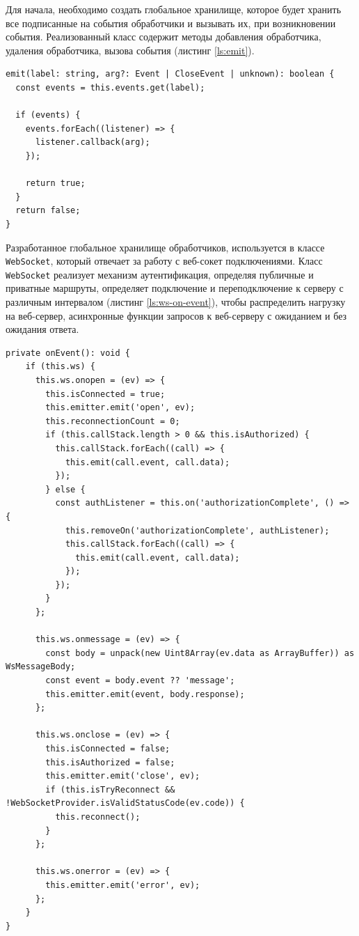 Для начала, необходимо создать глобальное хранилище, которое будет хранить все подписанные на события обработчики и вызывать их, при возникновении события. Реализованный класс содержит методы добавления обработчика, удаления обработчика, вызова события (листинг \ref{ls:emit}).

\begin{lstlisting}[caption={Метод вызова события из класса Emit}, label={ls:emit}]
emit(label: string, arg?: Event | CloseEvent | unknown): boolean {
  const events = this.events.get(label);

  if (events) {
    events.forEach((listener) => {
      listener.callback(arg);
    });

    return true;
  }
  return false;
}
\end{lstlisting}

Разработанное глобальное хранилище обработчиков, используется в классе \verb|WebSocket|, который отвечает за работу с веб-сокет подключениями. Класс \verb|WebSocket| реализует механизм аутентификация, определяя публичные и приватные маршруты, определяет подключение и переподключение к серверу с различным интервалом (листинг \ref{ls:ws-on-event}), чтобы распределить нагрузку на веб-сервер, асинхронные функции запросов к веб-серверу с ожиданием и без ожидания ответа.

\begin{lstlisting}[caption={Метод из класса WebSocket, передающий события в глобальную шину}, label={ls:ws-on-event}]
private onEvent(): void {
    if (this.ws) {
      this.ws.onopen = (ev) => {
        this.isConnected = true;
        this.emitter.emit('open', ev);
        this.reconnectionCount = 0;
        if (this.callStack.length > 0 && this.isAuthorized) {
          this.callStack.forEach((call) => {
            this.emit(call.event, call.data);
          });
        } else {
          const authListener = this.on('authorizationComplete', () => {
            this.removeOn('authorizationComplete', authListener);
            this.callStack.forEach((call) => {
              this.emit(call.event, call.data);
            });
          });
        }
      };

      this.ws.onmessage = (ev) => {
        const body = unpack(new Uint8Array(ev.data as ArrayBuffer)) as WsMessageBody;
        const event = body.event ?? 'message';
        this.emitter.emit(event, body.response);
      };

      this.ws.onclose = (ev) => {
        this.isConnected = false;
        this.isAuthorized = false;
        this.emitter.emit('close', ev);
        if (this.isTryReconnect && !WebSocketProvider.isValidStatusCode(ev.code)) {
          this.reconnect();
        }
      };

      this.ws.onerror = (ev) => {
        this.emitter.emit('error', ev);
      };
    }
}
\end{lstlisting}

